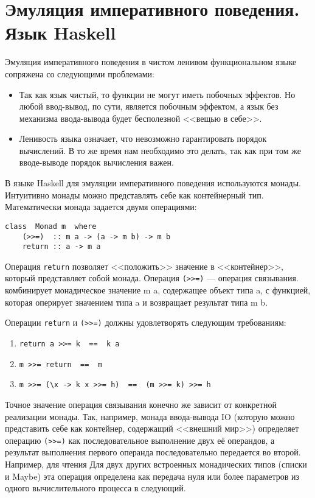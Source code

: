 \documentclass[a4paper]{article}
\begin{document}
\section{Эмуляция императивного поведения. Язык Haskell}
Эмуляция императивного поведения в чистом ленивом функциональном языке
сопряжена со следующими проблемами:
\begin{itemize}
\item Так как язык чистый, то функции не могут иметь побочных
  эффектов. Но любой ввод-вывод, по сути, является побочным эффектом,
  а язык без механизма ввода-вывода будет бесполезной <<вещью в
  себе>>.
\item Ленивость языка означает, что невозможно гарантировать порядок
  вычислений. В то же время нам необходимо это делать, так как при том
  же вводе-выводе порядок вычисления важен.
\end{itemize}

В языке Haskell для эмуляции императивного поведения используются
монады. Интуитивно монады можно представлять себе как контейнерный
тип. Математически монада задается двумя операциями:
\begin{verbatim}
class  Monad m  where
    (>>=)  :: m a -> (a -> m b) -> m b
    return :: a -> m a
\end{verbatim}
Операция \texttt{return} позволяет <<положить>> значение в
<<контейнер>>, который представляет собой монада. Операция
\verb|(>>=)| --- операция связывания. комбинирует монадическое
значение m a, содержащее объект типа a, с функцией, которая оперирует
значением типа a и возвращает результат типа m b.

Операции \texttt{return} и \verb|(>>=)| должны удовлетворять
следующим требованиям:
\begin{enumerate}
\item \verb|return a >>= k  ==  k a|
\item \verb|m >>= return  ==  m|
\item \verb|m >>= (\x -> k x >>= h)  ==  (m >>= k) >>= h|
\end{enumerate}

Точное значение операция связывания конечно же зависит от конкретной
реализации монады. Так, например, монада ввода-вывода IO (которую
можно представить себе как контейнер, содержащий <<внешний мир>>)
определяет операцию \verb|(>>=)| как последовательное выполнение двух её
операндов, а результат выполнения первого операнда последовательно
передается во второй. Например, для чтения Для двух других встроенных монадических типов
(списки и Maybe) эта операция определена как передача нуля или более
параметров из одного вычислительного процесса в следующий.
\end{document}

